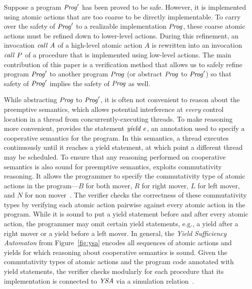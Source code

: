 Suppose a program $\mathit{Prog}'$ has been proved to be safe.
However, it is implemented using atomic actions that are too coarse to be directly implementable.  
To carry over the safety of $\mathit{Prog}'$ to a realizable implementation $\mathit{Prog}$, 
these coarse atomic actions must be refined down to lower-level actions.
During this refinement, an invocation $\mathit{call}\ A$ of a high-level atomic action $A$ is rewritten into an 
invocation $\mathit{call}\ P$ of a procedure that is implemented using low-level actions.
The main contribution of this paper is a verification method that allows us to safely refine
program $\mathit{Prog}'$ to another program $\mathit{Prog}$ (or abstract $\mathit{Prog}$ to $\mathit{Prog}'$) so that 
safety of $\mathit{Prog}'$ implies the safety of $\mathit{Prog}$ as well.

While abstracting $\mathit{Prog}$ to $\mathit{Prog}'$, it is often not convenient to 
reason about the preemptive semantics, which allows potential interference 
at {\em every\/} control location in a thread from concurrently-executing threads.
To make reasoning more convenient, \civl provides the statement $\mathit{yield}\ e$, an annotation 
used to specify a cooperative semantics for the program.
In this semantics, a thread executes continuously until it reaches a yield statement, 
at which point a different thread may be scheduled.
To ensure that any reasoning performed on cooperative semantics is also sound for preemptive semantics,
\civl exploits commutativity reasoning.
It allows the programmer to specify 
the commutativity type of atomic actions in the program---$B$ for both mover, $R$ for right mover, $L$ for left mover, 
and $N$ for non mover~\cite{FlanaganFLQ08}. 
The \civl verifier checks the correctness of these commutativity types by verifying each atomic action pairwise against 
every atomic action in the program.
While it is sound to put a yield statement before and after every atomic action,
the programmer may omit certain yield statements, e.g., a yield after a right mover or a yield before a left mover.
In general, the {\em Yield Sufficiency Automaton\/} from Figure~\ref{fig:ysa} encodes 
all sequences of atomic actions and yields for which reasoning about cooperative semantics is sound.
Given the commutativity types of atomic actions and the program code annotated with yield statements,
the \civl verifier checks modularly for each procedure that its implementation is connected to $\mathit{YSA}$
via a simulation relation~\cite{HenzingerHK95}.

